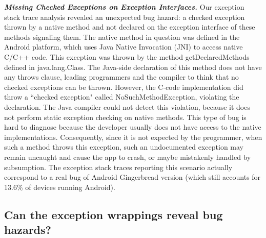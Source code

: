 \emph{\textbf{Missing Checked Exceptions on Exception Interfaces.}} 
Our exception stack trace analysis revealed an unexpected bug hazard: a 
checked exception thrown by a native method and not declared on the exception 
interface of these methods signaling them. The native method in question was defined in
 the Android platform, which uses Java Native Invocation (JNI) to access 
native C/C++ code. This exception was thrown by the method getDeclaredMethods defined in java.lang.Class. 
The Java-side declaration of this method does not have any throws clause, 
leading programmers and the compiler to think that no checked exceptions can be thrown.
 However, the C-code implementation did throw a ``checked exception" called NoSuchMethodException, 
violating the declaration. The Java compiler could not detect this violation, because it does 
not perform static exception checking on native methods. This type of bug is hard to diagnose
because the developer usually does not have access to the native implementations. 
Consequently, since it is not expected by the programmer, when such a method throws 
this exception, such an undocumented exception may remain
uncaught and cause the app to crash, or maybe mistakenly handled by subsumption.
The exception stack traces reporting this scenario actually correspond
to a real bug of Android 
Gingerbread version (which still accounts for 13.6\% of devices running Android).



\subsection{Can the exception wrappings reveal bug hazards?}



